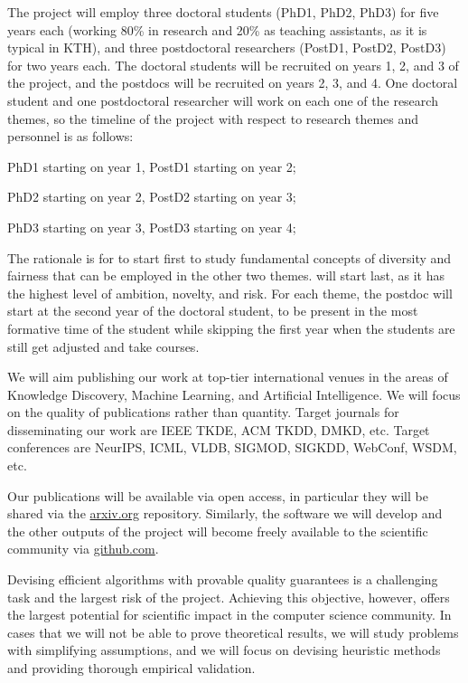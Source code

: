 \documentclass[a4paper,11pt]{article}
\begin{document}
The project will employ three doctoral students (PhD1, PhD2, PhD3) for five years each 
(working 80\% in research and 20\% as teaching assistants, as it is typical in KTH), 
and three postdoctoral researchers (PostD1, PostD2, PostD3) for two years each. 
The doctoral students will be recruited on years 1, 2, and 3 of the project, 
and the postdocs will be recruited on years 2, 3, and 4. 
One doctoral student and one postdoctoral researcher will work on each one of the research themes,
so the timeline of the project with respect to research themes and personnel is as follows:
\vspace{-2mm}
\begin{description}
\setlength{\itemsep}{-4pt}
\item[1.~~{\exploration}\,:] 
PhD1 starting on year 1, PostD1 starting on year 2;
\item[2.~~{\networks}\,:]
PhD2 starting on year 2, PostD2 starting on year 3;
\item[3.~~{\markets}\,:]
PhD3 starting on year 3, PostD3 starting on year 4;
\end{description}
\vspace{-2mm}
The rationale is for \exploration to start first to study 
fundamental concepts of diversity and fairness that can be employed in the other two themes.
\markets will start last, as it has the highest level of ambition, novelty, and risk.
For each theme, the postdoc will start at the second year of the doctoral student, 
to be present in the most formative time of the student while skipping the first year when 
the students are still get adjusted and take courses.

We will aim publishing our work at top-tier international venues
in the areas of Knowledge Discovery, Machine Learning, and Artificial Intelligence.
We will focus on the quality of publications rather than quantity.
Target journals for disseminating our work are IEEE TKDE, ACM TKDD, DMKD, etc. 
Target conferences are NeurIPS, ICML, VLDB, SIGMOD, SIGKDD, WebConf, WSDM, etc.

Our publications will be available via open access, 
in particular they will be shared via the {\small\url{arxiv.org}} repository. 
Similarly, the software we will develop and the other outputs of the project 
will become freely available to the scientific community via {\small\url{github.com}}.

Devising efficient algorithms with provable quality guarantees is a challenging task
and the largest risk of the project. 
Achieving this objective, however, offers the largest potential for scientific impact in the computer science community. 
In cases that we will not be able to prove theoretical results, 
we will study problems with simplifying assumptions, and 
we will focus on devising heuristic methods and providing thorough empirical validation.
\end{document}
